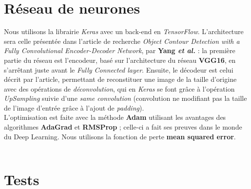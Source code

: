 \documentclass{report}
\begin{document}
\chapter{Réseau de neurones}

Nous utilisons la librairie \textit{Keras} avec un back-end en \textit{TensorFlow}. L'architecture sera celle présentée dans l'article de recherche \textit{Object Contour
Detection with a Fully Convolutional Encoder-Decoder Network}, par \textbf{Yang
\textit{et al.}} : la première partie du réseau est l'encodeur, basé sur l'architecture du réseau \textbf{VGG16}, en s'arrêtant juste avant le \textit{Fully Connected layer}.
Ensuite, le décodeur est celui décrit par l'article, permettant de reconstituer
une image de la taille d'origine avec des opérations de \textit{déconvolution},
qui en \textit{Keras} se font grâce à l'opération \textit{UpSampling} suivie d'une
\textit{same convolution} (convolution ne modifiant pas la taille de l'image d'entrée
grâce à l'ajout de \textit{padding}). \\
L'optimisation est faite avec la méthode \textbf{Adam} utilisant les avantages des
algorithmes \textbf{AdaGrad} et \textbf{RMSProp}  ; celle-ci a fait ses preuves
dans le monde du Deep Learning. Nous utilisons la fonction de perte \textbf{mean
squared error}. \\ \\

\chapter{Tests}
\end{document}
